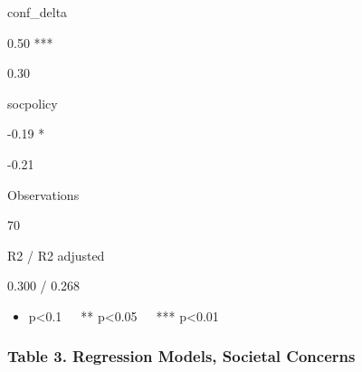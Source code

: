 \documentclass[
]{article}
\providecommand{\tightlist}{%
  \setlength{\itemsep}{0pt}\setlength{\parskip}{0pt}}
\begin{document}
conf\_delta

0.50 ***

0.30

socpolicy

-0.19 *

-0.21

Observations

70

R2 / R2 adjusted

0.300 / 0.268

\begin{itemize}
\tightlist
\item
  p\textless0.1~~~** p\textless0.05~~~*** p\textless0.01
\end{itemize}

\hypertarget{table-3.-regression-models-societal-concerns}{%
\subsubsection{Table 3. Regression Models, Societal
Concerns}\label{table-3.-regression-models-societal-concerns}}
\end{document}

